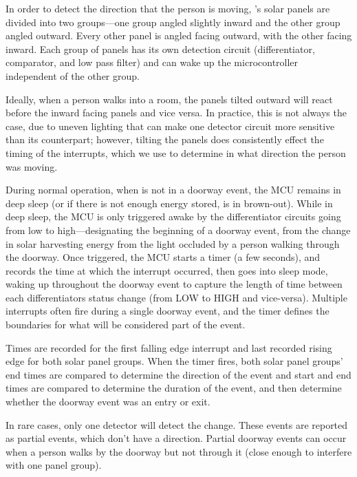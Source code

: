 In order to detect the direction that the person is moving, \sysname's solar panels are divided into two groups---one group angled slightly inward and the other group angled outward.
Every other panel is angled facing outward, with the other facing inward.
Each group of panels has its own detection circuit (differentiator, comparator, and low pass filter) and can wake up the microcontroller independent of the other group.

Ideally, when a person walks into a room, the panels tilted outward will react before the inward facing panels and vice versa.
In practice, this is not always the case, due to uneven lighting that can make one detector circuit more sensitive than its counterpart; however, tilting the panels does consistently effect the timing of the interrupts, which we use to determine in what direction the person was moving.

During normal operation, when \sysname is not in a doorway event, the MCU remains in deep sleep (or if there is not enough energy stored, is in brown-out).
While in deep sleep, the MCU is only triggered awake by the differentiator circuits going from low to high---designating the beginning of a doorway event, from the change in solar harvesting energy from the light occluded by a person walking through the doorway.
Once triggered, the MCU starts a timer (a few seconds), and records the time at which the interrupt occurred, then goes into sleep mode, waking up throughout the doorway event to capture the length of time between each differentiators status change (from LOW to HIGH and vice-versa).
Multiple interrupts often fire during a single doorway event, and the timer defines the boundaries for what will be considered part of the event.

Times are recorded for the first falling edge interrupt and last recorded rising edge for both solar panel groups.
When the timer fires, both solar panel groups' end times are compared to determine the direction of the event and start and end times are compared to determine the duration of the event, and then determine whether the doorway event was an entry or exit.


In rare cases, only one detector will detect the change.
These events are reported as partial events, which don't have a direction.
Partial doorway events can occur when a person walks by the doorway but not through it (close enough to interfere with one panel group).


